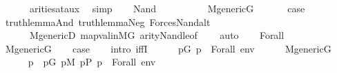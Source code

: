 \begin{isabellebody}
\ \ \ \ \ \ arities{\isacharunderscore}{\kern0pt}at{\isacharunderscore}{\kern0pt}aux\ \isamarkupfalse%
\ simp\isanewline
{}\isamarkupfalse%
\isanewline
\ \ \isamarkupfalse%
\ {\isacharparenleft}{\kern0pt}Nand\ {\isasymphi}\ {\isasympsi}{\isacharparenright}{\kern0pt}\isanewline
\ \ \isamarkupfalse%
\ \isanewline
\ \ \isamarkupfalse%
\ {\isacartoucheopen}M{\isacharunderscore}{\kern0pt}generic{\isacharparenleft}{\kern0pt}G{\isacharparenright}{\kern0pt}{\isacartoucheclose}\isanewline
\ \ \isamarkupfalse%
\isanewline
\ \ \isamarkupfalse%
\ {\isacharquery}{\kern0pt}case\ \isanewline
\ \ \ \ \isamarkupfalse%
\ truth{\isacharunderscore}{\kern0pt}lemma{\isacharunderscore}{\kern0pt}And\ truth{\isacharunderscore}{\kern0pt}lemma{\isacharunderscore}{\kern0pt}Neg\ Forces{\isacharunderscore}{\kern0pt}Nand{\isacharunderscore}{\kern0pt}alt\ \isanewline
\ \ \ \ \ \ M{\isacharunderscore}{\kern0pt}genericD\ map{\isacharunderscore}{\kern0pt}val{\isacharunderscore}{\kern0pt}in{\isacharunderscore}{\kern0pt}MG\ arity{\isacharunderscore}{\kern0pt}Nand{\isacharunderscore}{\kern0pt}le{\isacharbrackleft}{\kern0pt}of\ {\isasymphi}\ {\isasympsi}{\isacharbrackright}{\kern0pt}\ \isamarkupfalse%
\ auto\isanewline
{}\isamarkupfalse%
\isanewline
\ \ \isamarkupfalse%
\ {\isacharparenleft}{\kern0pt}Forall\ {\isasymphi}{\isacharparenright}{\kern0pt}\isanewline
\ \ \isamarkupfalse%
\ {\isacartoucheopen}M{\isacharunderscore}{\kern0pt}generic{\isacharparenleft}{\kern0pt}G{\isacharparenright}{\kern0pt}{\isacartoucheclose}\isanewline
\ \ \isamarkupfalse%
\ {\isacharquery}{\kern0pt}case\isanewline
\ \ \isamarkupfalse%
\ {\isacharparenleft}{\kern0pt}intro\ iffI{\isacharparenright}{\kern0pt}\isanewline
\ \ \ \ \isamarkupfalse%
\ {\isachardoublequoteopen}{\isasymexists}p{\isasymin}G{\isachardot}{\kern0pt}\ {\isacharparenleft}{\kern0pt}p\ {\isasymtturnstile}\ Forall{\isacharparenleft}{\kern0pt}{\isasymphi}{\isacharparenright}{\kern0pt}\ env{\isacharparenright}{\kern0pt}{\isachardoublequoteclose}\isanewline
\ \ \ \ \isamarkupfalse%
\ {\isacartoucheopen}M{\isacharunderscore}{\kern0pt}generic{\isacharparenleft}{\kern0pt}G{\isacharparenright}{\kern0pt}{\isacartoucheclose}\isanewline
\ \ \ \ \isamarkupfalse%
\ p\ \ {\isachardoublequoteopen}p{\isasymin}G{\isachardoublequoteclose}\ {\isachardoublequoteopen}p{\isasymin}M{\isachardoublequoteclose}\ {\isachardoublequoteopen}p{\isasymin}P{\isachardoublequoteclose}\ {\isachardoublequoteopen}p\ {\isasymtturnstile}\ Forall{\isacharparenleft}{\kern0pt}{\isasymphi}{\isacharparenright}{\kern0pt}\ env{\isachardoublequoteclose}\isanewline

\end{isabellebody}
